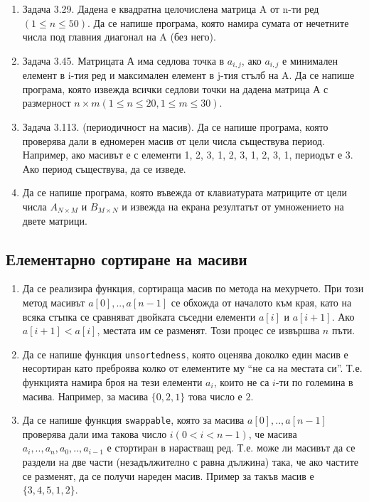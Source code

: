 \documentclass[12pt,a4paper]{article}
\newcommand{\code}[1]{\texttt{#1}}
\begin{document}
{\begin{enumerate}[resume]
	\item Задача 3.29. \cite{sbornik} Дадена е квадратна целочислена матрица A от n-ти ред $(1 \leq n \leq 50)$. Да се напише програма, която намира сумата от нечетните числа под главния диагонал на A (без него).

  \item Задача 3.45. \cite{sbornik} Матрицата А има седлова точка в $a_{i,j}$, ако $a_{i,j}$ е минимален елемент в i-тия ред и максимален елемент в j-тия стълб на A. Да се напише програма, която извежда всички седлови точки на дадена матрица А с размерност $n \times m (1 \leq n \leq 20, 1 \leq m \leq 30)$.

	\item Задача 3.113. (периодичност на масив). \cite{sbornik}	Да се напише програма, която проверява дали в едномерен масив от цели числа съществува период. Например, ако масивът е с елементи 1, 2, 3, 1, 2, 3, 1, 2, 3, 1, периодът е 3. Ако период съществува, да се изведе.

	\item Да се напише програма, която въвежда от клавиатурата матриците от цели числа $A_{N\times M}$ и $B_{M\times N}$ и извежда на екрана резултатът от умножението на двете матрици.


\end{enumerate}

\subsection {Елементарно сортиране на масиви}

\begin{enumerate}[resume]
  \item Да се реализира функция, сортираща масив по метода на мехурчето. При този метод масивът $a[0],..,a[n-1]$ се обхожда от началото към края, като на всяка стъпка се сравняват двойката съседни елементи $a[i]$ и $a[i+1]$. Ако $a[i+1] < a[i]$, местата им се разменят. Този процес се извършва $n$ пъти.
  \item Да се напише функция \code{unsortedness}, която оценява доколко един масив е несортиран като преброява колко от елементите му ``не са на местата си''. Т.е. функцията намира броя на тези елементи $a_i$, които не са $i$-ти по големина в масива. Например, за масива $\{0,2,1\}$ това число е $2$.
  \item Да се напише функция \code{swappable}, която за масива $a[0],..,a[n-1]$ проверява дали има такова число $i(0 < i < n-1)$, че масива $a_i,..,a_n,a_0,..,a_{i-1}$ е стортиран в нарастващ ред. Т.е. може ли масивът да се раздели на две части (незадължително с равна дължина) така, че ако частите се разменят, да се получи нареден масив. Пример за такъв масив е $\{3,4,5,1,2\}$.


\end{enumerate}}
\end{document}
